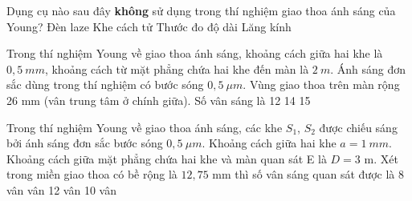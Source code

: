 \setcounter{paragraph}{0}
\setcounter{ex}{0}
\PhanI
\begin{ex}
Dụng cụ nào sau đây \textbf{không} sử dụng trong thí nghiệm giao thoa ánh sáng của Young?
\choice
{Đèn laze}
{Khe cách tử}
{Thước đo độ dài}
{\True Lăng kính}
\loigiai{  }
\end{ex}
\begin{ex}
Trong thí nghiệm Young về giao thoa ánh sáng, khoảng cách giữa hai khe là $0,5\ mm$, khoảng cách từ mặt phẳng chứa hai khe đến màn là $2\ m$. Ánh sáng đơn sắc dùng trong thí nghiệm có bước sóng $0,5\ \mu m$. Vùng giao thoa trên màn rộng 26 mm (vân trung tâm ở chính giữa). Số vân sáng là
\choice
{12}
{}
{14}
{15}
\end{ex}
\begin{ex}
Trong thí nghiệm Young về giao thoa ánh sáng, các khe $S_{1}$, $S_{2}$ được chiếu sáng bởi ánh sáng đơn sắc bước sóng $0,5\ \mu m$. Khoảng cách giữa hai khe $a = 1\ mm$. Khoảng cách giữa mặt phẳng chứa hai khe và màn quan sát E là $D = 3$ m. Xét trong miền giao thoa có bề rộng là $12,75$ mm thì số vân sáng quan sát được là
\choice
{8 vân}
{ vân}
{12 vân}
{10 vân}
\loigiai{}
\end{ex}

